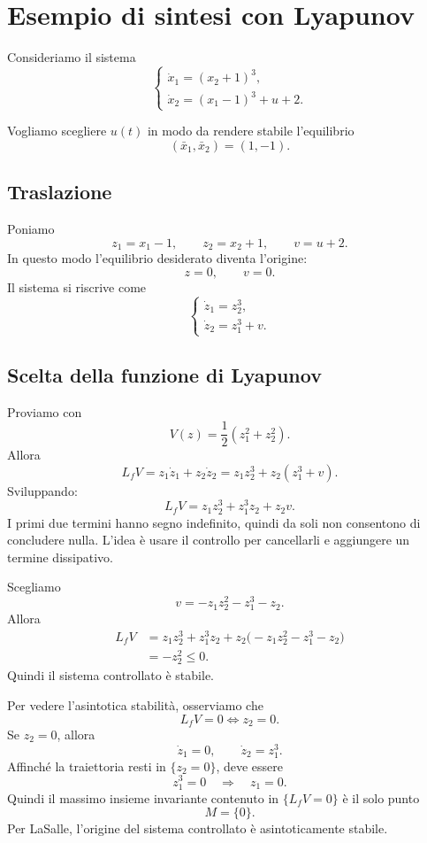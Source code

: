 \section{Esempio di sintesi con Lyapunov}

Consideriamo il sistema
\begin{equation}
\label{eq:L23-controllo}
\begin{cases}
\dot x_1 = (x_2+1)^3,\\[4pt]
\dot x_2 = (x_1-1)^3 + u + 2.
\end{cases}
\end{equation}

Vogliamo scegliere \(u(t)\) in modo da rendere stabile l'equilibrio
\[
(\bar x_1,\bar x_2)=(1,-1).
\]

\subsection{Traslazione}

Poniamo
\[
z_1=x_1-1,\qquad z_2=x_2+1,
\qquad
v=u+2.
\]
In questo modo l'equilibrio desiderato diventa l'origine:
\[
z=0,\qquad v=0.
\]
Il sistema si riscrive come
\[
\begin{cases}
\dot z_1 = z_2^3,\\[4pt]
\dot z_2 = z_1^3 + v.
\end{cases}
\]

\subsection{Scelta della funzione di Lyapunov}

Proviamo con
\[
V(z)=\frac12(z_1^2+z_2^2).
\]
Allora
\[
L_fV=z_1\dot z_1+z_2\dot z_2
= z_1 z_2^3 + z_2(z_1^3+v).
\]
Sviluppando:
\[
L_fV = z_1z_2^3 + z_1^3z_2 + z_2v.
\]
I primi due termini hanno segno indefinito, quindi da soli non consentono di concludere nulla.  
L'idea è usare il controllo per cancellarli e aggiungere un termine dissipativo.

Scegliamo
\[
v = -z_1z_2^2 - z_1^3 - z_2.
\]
Allora
\begin{align*}
L_fV
&= z_1z_2^3 + z_1^3z_2 + z_2\bigl(-z_1z_2^2-z_1^3-z_2\bigr)\\
&= -z_2^2 \le 0.
\end{align*}
Quindi il sistema controllato è stabile.

Per vedere l'asintotica stabilità, osserviamo che
\[
L_fV=0 \iff z_2=0.
\]
Se \(z_2=0\), allora
\[
\dot z_1=0,
\qquad
\dot z_2=z_1^3.
\]
Affinché la traiettoria resti in \(\{z_2=0\}\), deve essere
\[
z_1^3=0 \quad \Longrightarrow \quad z_1=0.
\]
Quindi il massimo insieme invariante contenuto in \(\{L_fV=0\}\) è il solo punto
\[
M=\{0\}.
\]
Per LaSalle, l'origine del sistema controllato è asintoticamente stabile.

